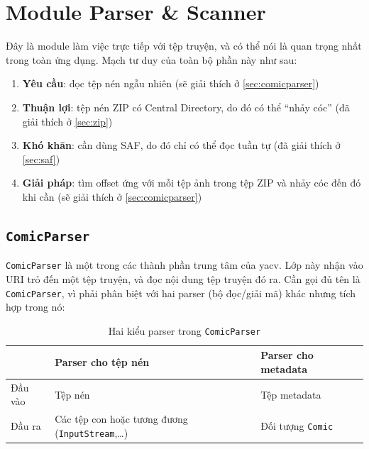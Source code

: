 \documentclass[../../../../thesis]{subfiles}
\begin{document}
\section{Module Parser \& Scanner}\label{sec:module-parser-scanner}

Đây là module làm việc trực tiếp với tệp truyện, và có thể nói là quan trọng
nhất trong toàn ứng dụng. Mạch tư duy của toàn bộ phần này như sau:

\begin{enumerate}
    \item
        \textbf{Yêu cầu}: đọc tệp nén ngẫu nhiên (sẽ giải thích ở
        \autoref{sec:comicparser})
    \item
        \textbf{Thuận lợi}: tệp nén ZIP có Central Directory, do đó có thể
        ``nhảy cóc'' (đã giải thích ở \autoref{sec:zip})
    \item
        \textbf{Khó khăn}: cần dùng SAF, do đó chỉ có thể đọc tuần tự (đã giải
        thích ở \autoref{sec:saf})
    \item
        \textbf{Giải pháp}: tìm offset ứng với mỗi tệp ảnh trong tệp ZIP và nhảy
        cóc đến đó khi cần (sẽ giải thích ở \autoref{sec:comicparser})
\end{enumerate}



\subsection{\texttt{ComicParser}}\label{sec:comicparser}

\texttt{ComicParser} là một trong các thành phần trung tâm của yacv. Lớp này
nhận vào URI trỏ đến một tệp truyện, và đọc nội dung tệp truyện đó ra. Cần gọi
đủ tên là \texttt{ComicParser}, vì phải phân biệt với hai parser (bộ đọc/giải
mã) khác nhưng tích hợp trong nó:

\begin{table}[H]
    \centering
    \caption{Hai kiểu parser trong \texttt{ComicParser}}
    \label{tab:2-parsers}
    \begin{tabular}{l p{6cm} l}
        \toprule
                & Parser cho tệp nén & Parser cho metadata \\
        \midrule
        Đầu vào & Tệp nén            & Tệp metadata \\
        Đầu ra  & Các tệp con hoặc tương đương (\texttt{InputStream},\ldots) & Đối tượng \texttt{Comic} \\
        \bottomrule
    \end{tabular}
\end{table}
\end{document}
